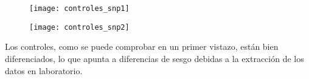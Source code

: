 \begin{figure}[H]
\centering
\begin{minipage}{.5\textwidth}
  \centering
  \texttt{[image: controles\_snp1]}
  \label{fig:snp1-control1}
\end{minipage}%
\begin{minipage}{.5\textwidth}
  \centering
  \texttt{[image: controles\_snp2]}
  \label{fig:snp2-control1}
\end{minipage}
\end{figure}

Los controles, como se puede comprobar en un primer vistazo, están bien diferenciados, lo que apunta a diferencias de sesgo debidas a la extracción de los datos en laboratorio.

